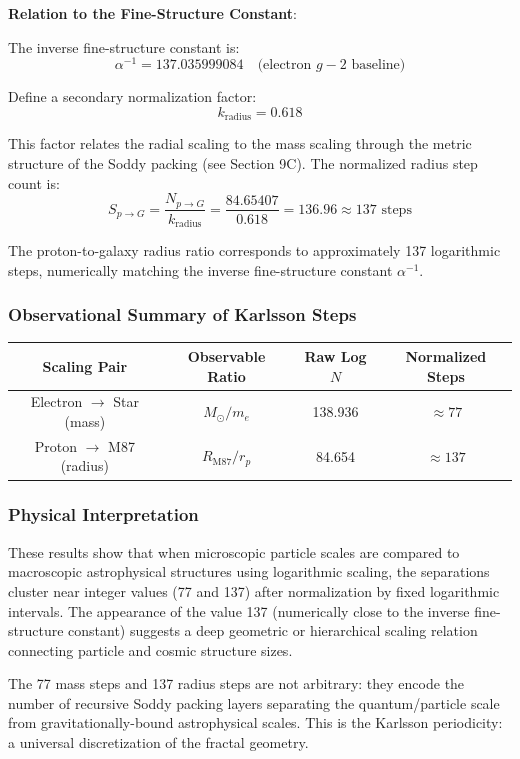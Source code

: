 \documentclass[11pt,a4paper]{article}
\begin{document}
\noindent\textbf{Relation to the Fine-Structure Constant}:

The inverse fine-structure constant is:
\[
\alpha^{-1} = 137.035999084 \quad \text{(electron $g-2$ baseline)}
\]

Define a secondary normalization factor:
\[
k_{\text{radius}} = 0.618
\]

This factor relates the radial scaling to the mass scaling through the metric structure of the Soddy packing (see Section 9C). The normalized radius step count is:
\[
S_{p \to G} = \frac{N_{p \to G}}{k_{\text{radius}}} = \frac{84.65407}{0.618} = 136.96 \approx \boxed{137 \text{ steps}}
\]

The proton-to-galaxy radius ratio corresponds to approximately 137 logarithmic steps, numerically matching the inverse fine-structure constant $\alpha^{-1}$.

\subsubsection{Observational Summary of Karlsson Steps}

\begin{table}[h]
\centering
\begin{tabular}{|c|c|c|c|}
\hline
\textbf{Scaling Pair} & \textbf{Observable Ratio} & \textbf{Raw Log $N$} & \textbf{Normalized Steps} \\
\hline
Electron $\to$ Star (mass) & $M_\odot/m_e$ & 138.936 & $\approx 77$ \\
Proton $\to$ M87 (radius) & $R_{\text{M87}}/r_p$ & 84.654 & $\approx 137$ \\
\hline
\end{tabular}
\end{table}

\subsubsection{Physical Interpretation}

These results show that when microscopic particle scales are compared to macroscopic astrophysical structures using logarithmic scaling, the separations cluster near integer values (77 and 137) after normalization by fixed logarithmic intervals. The appearance of the value 137 (numerically close to the inverse fine-structure constant) suggests a deep geometric or hierarchical scaling relation connecting particle and cosmic structure sizes.

The 77 mass steps and 137 radius steps are not arbitrary: they encode the number of recursive Soddy packing layers separating the quantum/particle scale from gravitationally-bound astrophysical scales. This is the Karlsson periodicity: a universal discretization of the fractal geometry.
\end{document}
